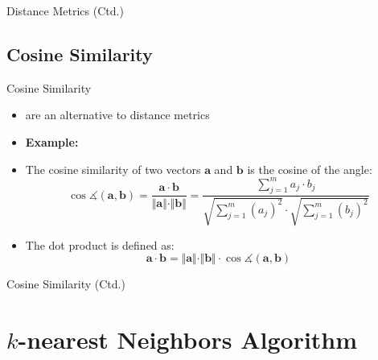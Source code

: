 \begin{frame}{Distance Metrics (Ctd.)}{}
	
\end{frame}


\subsection{Cosine Similarity}

\begin{frame}{Cosine Similarity}{}
	\begin{itemize}
		\item {} are an alternative to distance metrics
		\item \textbf{Example:} 
		\item The cosine similarity of two vectors $\bm{a}$ and $\bm{b}$ is the cosine of the angle:
		\begin{equation}
			\cos \measuredangle (\bm{a}, \bm{b}) = \frac{\bm{a} \cdot \bm{b}}{\Vert \bm{a} \Vert \cdot \Vert \bm{b} \Vert}
				= \frac{\sum_{j=1}^m a_j \cdot b_j}{\sqrt{\sum_{j=1}^m (a_j)^2} \cdot \sqrt{\sum_{j=1}^m (b_j)^2}}
		\end{equation}
		\item The dot product is defined as:
		\begin{equation}
			\bm{a} \cdot \bm{b} = \Vert \bm{a} \Vert \cdot \Vert \bm{b} \Vert \cdot \cos \measuredangle (\bm{a}, \bm{b})
		\end{equation}
	\end{itemize}
\end{frame}


\begin{frame}{Cosine Similarity (Ctd.)}{}
	
\end{frame}


\section{$k$-nearest Neighbors Algorithm}

